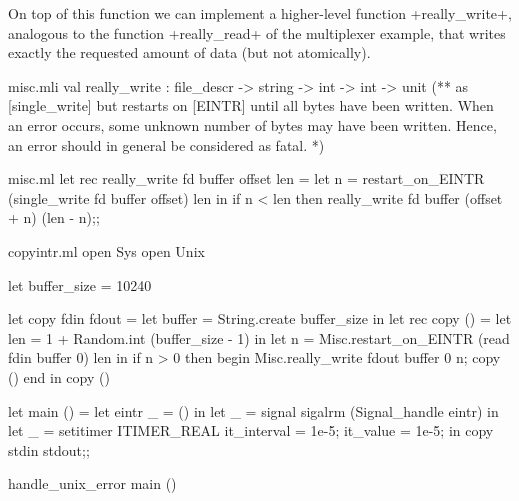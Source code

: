 On top of this function we can implement a higher-level function
\ml+really_write+, analogous to the function \ml+really_read+ of the
multiplexer example, that writes exactly the requested amount of data
(but not atomically).
%
\begin{codefile}{misc.mli}
val really_write : file_descr -> string -> int -> int -> unit
(** as [single_write] but restarts on [EINTR] until all bytes have been
written. When an error occurs, some unknown number of bytes may have been
written. Hence, an error should in general be considered as fatal. *)
\end{codefile}
%
\begin{listingcodefile}{misc.ml}
let rec really_write fd buffer offset len =
  let n = restart_on_EINTR (single_write fd buffer offset) len in
  if n < len then really_write fd buffer (offset + n) (len - n);;
\end{listingcodefile}
%
\begin{codefile}{copyintr.ml}
open Sys
open Unix

let buffer_size = 10240

let copy fdin fdout = 
  let buffer = String.create buffer_size in
  let rec copy ()  =
    let len = 1 + Random.int (buffer_size - 1) in
    let n = Misc.restart_on_EINTR (read fdin buffer 0) len in
    if n > 0 then
      begin
        Misc.really_write fdout buffer 0 n;
        copy ()
      end in
  copy ()

let main () =
  let eintr _ = () in
  let _ = signal sigalrm (Signal_handle eintr) in
  let _ = setitimer ITIMER_REAL { it_interval = 1e-5; it_value = 1e-5; } in
  copy stdin stdout;;

handle_unix_error main ()
\end{codefile}
%

